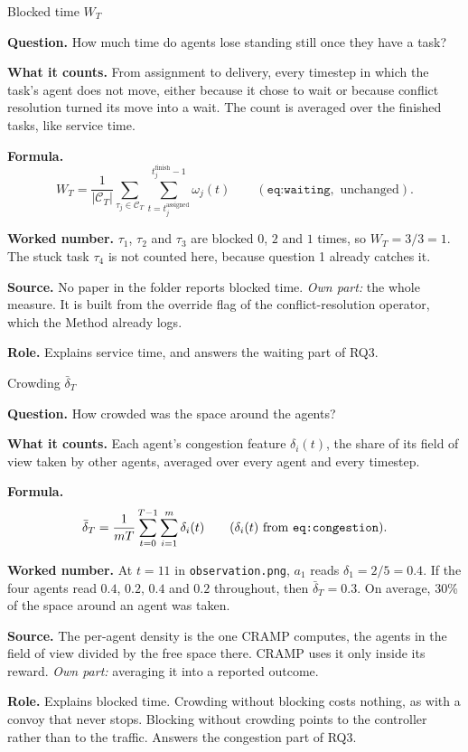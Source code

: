 \documentclass[11pt,a4paper]{article}
\newcommand{\row}[1]{\par\smallskip\noindent\textbf{#1}\enspace}
\begin{document}
\begin{card}{Blocked time $W_T$}
\row{Question.} How much time do agents lose standing still once they have
a task?

\row{What it counts.} From assignment to delivery, every timestep in which
the task's agent does not move, either because it chose to wait or
because conflict resolution turned its move into a wait. The count is
averaged over the finished tasks, like service time.

\row{Formula.}
\[
  W_T = \frac{1}{|\mathcal{C}_T|}\sum_{\tau_j\in\mathcal{C}_T}
        \sum_{t=t_j^{\mathrm{assigned}}}^{t_j^{\mathrm{finish}}-1}\omega_j(t)
  \qquad (\texttt{eq:waiting}, \text{ unchanged}).
\]

\row{Worked number.} $\tau_1$, $\tau_2$ and $\tau_3$ are blocked $0$, $2$
and $1$ times, so $W_T = 3/3 = 1$. The stuck task $\tau_4$ is not counted
here, because question 1 already catches it.

\row{Source.} No paper in the folder reports blocked time. \emph{Own
part:} the whole measure. It is built from the override flag of the
conflict-resolution operator, which the Method already logs.

\row{Role.} Explains service time, and answers the waiting part of RQ3.
\end{card}

\begin{card}{Crowding $\bar\delta_T$}
\row{Question.} How crowded was the space around the agents?

\row{What it counts.} Each agent's congestion feature $\delta_i(t)$, the
share of its field of view taken by other agents, averaged over every
agent and every timestep.

\row{Formula.}
\[
  \bar\delta_T = \frac{1}{mT}\sum_{t=0}^{T-1}\sum_{i=1}^{m}\delta_i(t)
  \qquad (\delta_i(t) \text{ from \texttt{eq:congestion}}).
\]

\row{Worked number.} At $t=11$ in \texttt{observation.png}, $a_1$ reads
$\delta_1 = 2/5 = 0.4$. If the four agents read $0.4$, $0.2$, $0.4$ and
$0.2$ throughout, then $\bar\delta_T = 0.3$. On average, 30\% of the space
around an agent was taken.

\row{Source.} The per-agent density is the one CRAMP
\citep{pham2024optimizingcrowdawaremultiagentpath} computes, the agents in
the field of view divided by the free space there. CRAMP uses it only
inside its reward. \emph{Own part:} averaging it into a reported outcome.

\row{Role.} Explains blocked time. Crowding without blocking costs
nothing, as with a convoy that never stops. Blocking without crowding
points to the controller rather than to the traffic. Answers the
congestion part of RQ3.
\end{card}
\end{document}
